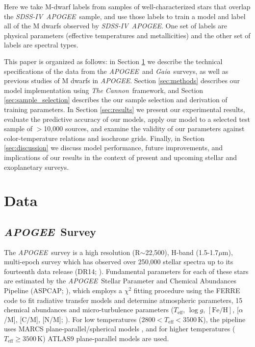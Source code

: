 \documentclass[twocolumn]{aastex62}
\newcommand{\apogee}{\textsl{APOGEE}}
\newcommand{\thecannon}{\textsl{The Cannon}}
\newcommand{\gaia}{\textsl{Gaia}}
\newcommand{\sdssiv}{\textsl{SDSS-IV}}
\newcommand{\teff}{T_{\mathrm{eff}}}
\newcommand{\logg}{\log g}
\newcommand{\feh}{[{\mathrm{Fe}/\mathrm{H}}]}
\begin{document}
Here we take M-dwarf labels from samples of well-characterized stars that overlap the
\sdssiv\ \apogee\ sample, and use those labels to train a model and label all of the M dwarfs observed by
\sdssiv\ \apogee. One set of labels are physical parameters (effective temperatures and metallicities)
and the other set of labels are spectral types. 


This paper is organized as follows: in Section \ref{sec:data} we describe the technical specifications of the data from the \apogee\ and \gaia\ surveys, as well as previous studies of M dwarfs in \apogee.
Section \ref{sec:methods} describes our model implementation using \thecannon\ framework, and Section \ref{sec:sample_selection} describes the our sample selection and derivation of training parameters.
In Section \ref{sec:results} we present our experimental results, evaluate the predictive accuracy of our models, apply our model to a selected test sample of $>$10,000 sources, and examine the validity of our parameters against color-temperature relations and isochrone grids.
Finally, in Section \ref{sec:discussion} we discuss model performance, future improvements, and implications of our results in the context of present and upcoming stellar and exoplanetary surveys. \\


\section{Data} \label{sec:data}

\subsection{\apogee\ Survey}

The \apogee\ survey is a high resolution (R$\sim$22,500), H-band (1.5-1.7$\mu$m), multi-epoch survey which has observed over 250,000 stellar spectra up to its fourteenth data release (DR14; \citealt{Abolfathi:2017}). Fundamental parameters for each of these stars are estimated by the \apogee\ Stellar Parameter and Chemical Abundances Pipeline (ASPCAP; \citealt{Perez:2016}), which employs a $\chi^2$ fitting procedure using the FERRE code to fit radiative transfer models and determine atmospheric parameters, 15 chemical abundances and micro-turbulence parameters ($\teff$, $\logg$, $\feh$, [$\alpha$/M], [C/M], [N/M]; \citealt{Meszaros:2012}). For low temperatures ($2800<\teff<3500$\,K), the pipeline uses MARCS plane-parallel/spherical models \citep{Gustafsson:2008}, and for higher temperatures ($\teff\geq3500$\,K) ATLAS9 \citep{Castelli:2004} plane-parallel models are used.
\end{document}
